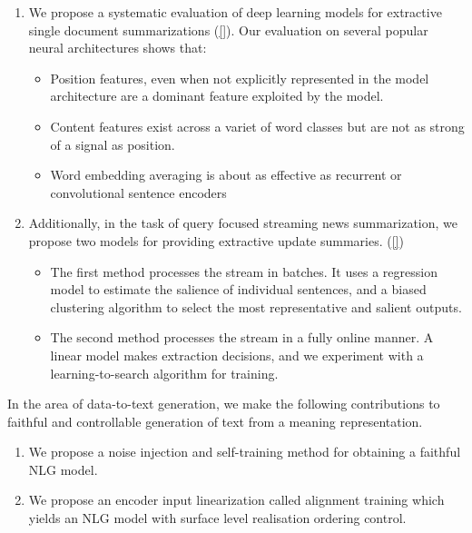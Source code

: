   
  \begin{enumerate}
          \item We propose a systematic evaluation of deep learning models
              for extractive single document summarizations (\autoref{}). 
              Our evaluation on several popular neural architectures shows 
              that:
              \begin{itemize}
                  \item Position features, even when not explicitly represented
                      in the model architecture are a dominant feature
                      exploited by the model.
                  \item Content features exist across a variet of word classes
                      but are not as strong of a signal as position.
                  \item Word embedding averaging is about as effective as 
                      recurrent or convolutional sentence encoders 
              \end{itemize}
          \item Additionally, in the task of query focused streaming news 
              summarization, we propose two models for providing 
              extractive update summaries. (\autoref{})
              \begin{itemize}
  
                  \item The first method processes the stream in  batches. 
                      It uses a regression model
                      to estimate the salience of individual 
                      sentences, and a biased clustering algorithm to select
                      the most representative and salient outputs.
                  \item The second method processes the stream in a fully
                      online manner. A linear model makes extraction
                      decisions, and we experiment with a learning-to-search
                      algorithm for training. 
              \end{itemize}
      \end{enumerate}
  
      In the area of data-to-text generation, we make the following 
      contributions to faithful and controllable generation of 
      text from a meaning representation. 
      \begin{enumerate}
          \item We propose a noise injection and self-training method
              for obtaining a faithful NLG model.
          \item We propose an encoder input linearization called alignment
              training which  yields an NLG model with surface level
              realisation ordering control.
      \end{enumerate}
  
